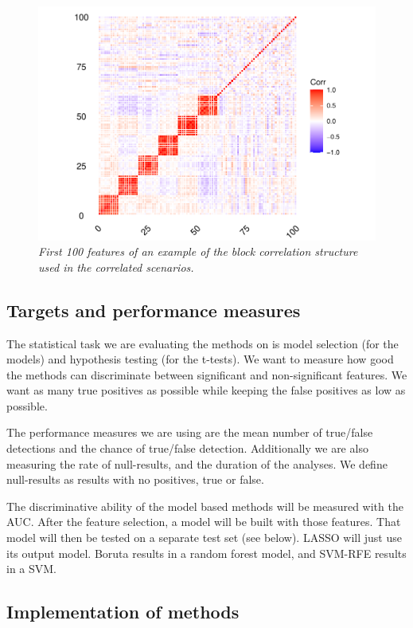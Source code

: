 \documentclass[
]{article}
\begin{document}
\begin{figure}

{\centering \includegraphics[width=0.75\linewidth]{main_files/figure-latex/blockcor-1} 

}

\caption{\textit{First 100 features of an example of the block correlation structure used in the correlated scenarios.}}\label{fig:blockcor}
\end{figure}

\hypertarget{targets-and-performance-measures}{%
\subsection{Targets and performance measures}\label{targets-and-performance-measures}}

The statistical task we are evaluating the methods on is model selection (for the models) and hypothesis testing (for the t-tests). We want to measure how good the methods can discriminate between significant and non-significant features. We want as many true positives as possible while keeping the false positives as low as possible.

The performance measures we are using are the mean number of true/false detections and the chance of true/false detection. Additionally we are also measuring the rate of null-results, and the duration of the analyses. We define null-results as results with no positives, true or false.

The discriminative ability of the model based methods will be measured with the AUC. After the feature selection, a model will be built with those features. That model will then be tested on a separate test set (see below). LASSO will just use its output model. Boruta results in a random forest model, and SVM-RFE results in a SVM.

\hypertarget{implementation-of-methods}{%
\subsection{Implementation of methods}\label{implementation-of-methods}}
\end{document}
